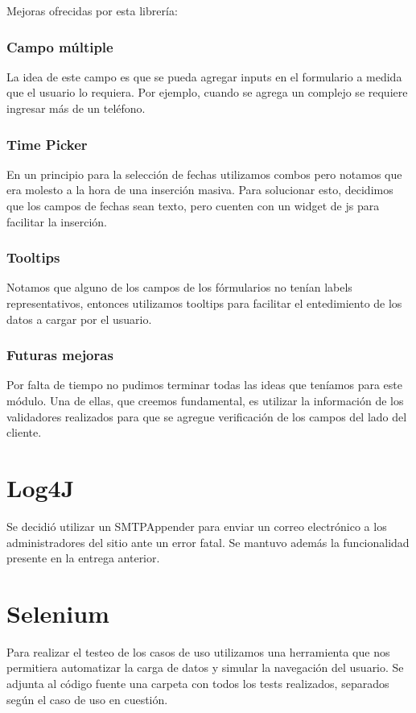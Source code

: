 \documentclass[a4paper,11pt]{article}
\begin{document}
Mejoras ofrecidas por esta librería:
\subsubsection{Campo múltiple}
La idea de este campo es que se pueda agregar inputs en el formulario
a medida que el usuario lo requiera. Por ejemplo, cuando se agrega
un complejo se requiere ingresar más de un teléfono.

\subsubsection{Time Picker}
En un principio para la selección de fechas utilizamos combos pero notamos
que era molesto a la hora de una inserción masiva. Para solucionar esto,
decidimos que los campos de fechas sean texto, pero cuenten con un
widget de js para facilitar la inserción.

\subsubsection{Tooltips}
Notamos que alguno de los campos de los fórmularios no tenían labels
representativos, entonces utilizamos tooltips para facilitar el entedimiento
de los datos a cargar por el usuario.

\subsubsection{Futuras mejoras}
Por falta de tiempo no pudimos terminar todas las ideas que teníamos para
este módulo. Una de ellas, que creemos fundamental, es utilizar la información
de los validadores realizados para que se agregue verificación de los campos
del lado del cliente.

\section{Log4J}
Se decidió utilizar un SMTPAppender para enviar un correo electrónico a los
administradores del sitio ante un error fatal. Se mantuvo además la funcionalidad
presente en la entrega anterior.

\section{Selenium}
Para realizar el testeo de los casos de uso utilizamos una herramienta que nos permitiera
automatizar la carga de datos y simular la navegación del usuario.
Se adjunta al código fuente una carpeta con todos los tests realizados, separados según
el caso de uso en cuestión.
\end{document}
